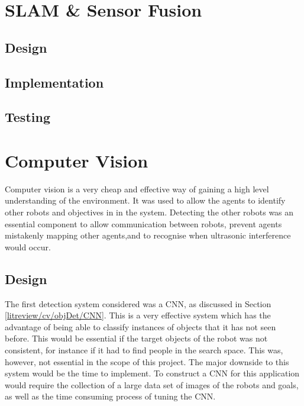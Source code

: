 \section{SLAM \& Sensor Fusion}\label{soft/SLAM}

\subsection{Design}\label{soft/SLAM/design}

\subsection{Implementation}\label{soft/SLAM/impl}

\subsection{Testing}\label{soft/SLAM/test}



\section{Computer Vision}\label{soft/cv}
Computer vision is a very cheap and effective way of gaining a high level understanding of the environment. It was used to allow the agents to identify other robots and objectives in in the system. Detecting the other robots was an essential component to allow communication between robots, prevent agents mistakenly mapping other agents,and to recognise when ultrasonic interference would occur.

\subsection{Design}\label{soft/cv/design}
The first detection system considered was a CNN, as discussed in Section \ref{litreview/cv/objDet/CNN}. This is a very effective system which has the advantage of
being able to classify instances of objects that it has not
seen before. This would be essential if the target objects of
the robot was not consistent, for instance if it had to find
people in the search space. This was, however, not essential
in the scope of this project. The major downside to this
system would be the time to implement. To construct a CNN for
this application would require the collection of a large data
set of images of the robots and goals, as well as the time
consuming process of tuning the CNN.

